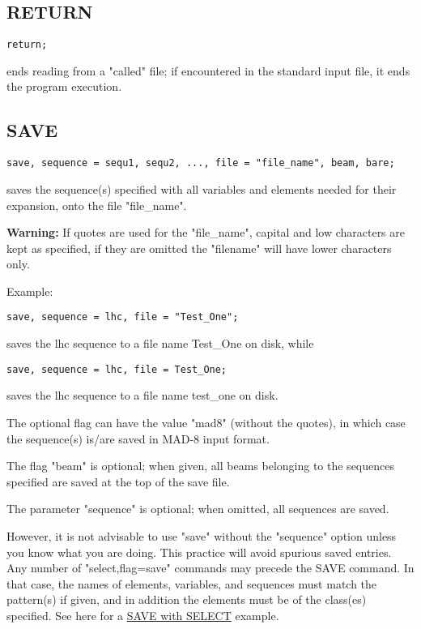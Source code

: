 \subsection{RETURN}
\begin{verbatim}
return;
\end{verbatim} 
ends reading from a "called" file; if encountered in the standard input
file, it ends the program execution.  


\subsection{SAVE}
\label{subsec:general_save}
\begin{verbatim}
save, sequence = sequ1, sequ2, ..., file = "file_name", beam, bare;
\end{verbatim} 
saves the sequence(s) specified with all variables and elements needed
for their expansion, onto the file "file\_name". 

{\bf Warning:} If quotes are used for
the "file\_name", capital and low characters are kept as specified, if they
are omitted the "filename" will have lower characters only. 

Example:
\begin{verbatim}
save, sequence = lhc, file = "Test_One";
\end{verbatim}
saves the lhc sequence to a file name Test\_One on disk, while
\begin{verbatim}
save, sequence = lhc, file = Test_One;
\end{verbatim}
saves the lhc sequence to a file name test\_one on disk.

The optional
flag can have the value "mad8" (without the quotes), in which case the
sequence(s) is/are saved in MAD-8 input format.  

The flag "beam" is optional; when given, all beams belonging to the
sequences specified are saved at the top of the save file.  

The parameter "sequence" is optional; when omitted, all sequences are
saved.  

However, it is not advisable to use "save" without the "sequence" option
unless you know what you are doing. This practice will avoid spurious
saved entries.    Any number of "select,flag=save" commands may precede
the SAVE command. In that case, the names of elements, variables, and
sequences must match the pattern(s) if given, and in addition the
elements must be of the class(es) specified. See here for a
\href{../Introduction/select.html#save_select}{SAVE with SELECT}
example.  

